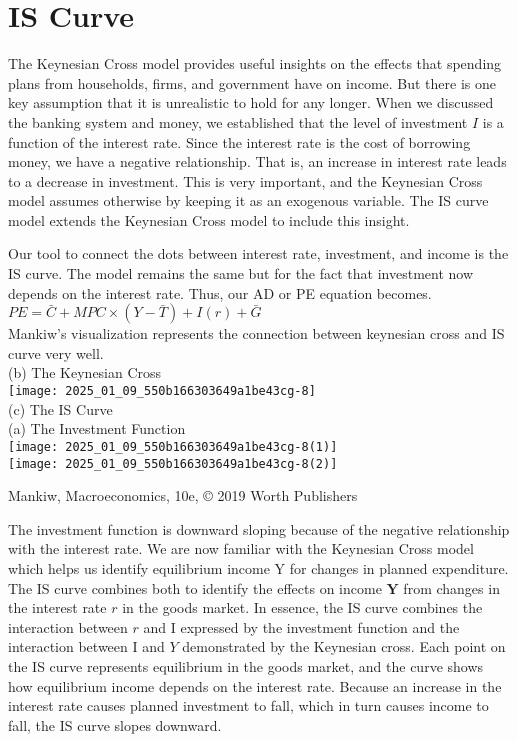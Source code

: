 \documentclass[10pt]{article}
\begin{document}
\section*{IS Curve}
The Keynesian Cross model provides useful insights on the effects that spending plans from households, firms, and government have on income. But there is one key assumption that it is unrealistic to hold for any longer. When we discussed the banking system and money, we established that the level of investment $I$ is a function of the interest rate. Since the interest rate is the cost of borrowing money, we have a negative relationship. That is, an increase in interest rate leads to a decrease in investment. This is very important, and the Keynesian Cross model assumes otherwise by keeping it as an exogenous variable. The IS curve model extends the Keynesian Cross model to include this insight.

Our tool to connect the dots between interest rate, investment, and income is the IS curve. The model remains the same but for the fact that investment now depends on the interest rate. Thus, our AD or PE equation becomes.\\
$P E=\bar{C}+M P C \times(Y-\bar{T})+I(r)+\bar{G}$\\
Mankiw's visualization represents the connection between keynesian cross and IS curve very well.\\
(b) The Keynesian Cross\\
\texttt{[image: 2025\_01\_09\_550b166303649a1be43cg-8]}\\
(c) The IS Curve\\
(a) The Investment Function\\
\texttt{[image: 2025\_01\_09\_550b166303649a1be43cg-8(1)]}\\
\texttt{[image: 2025\_01\_09\_550b166303649a1be43cg-8(2)]}

Mankiw, Macroeconomics, 10e, © 2019 Worth Publishers

The investment function is downward sloping because of the negative relationship with the interest rate. We are now familiar with the Keynesian Cross model which helps us identify equilibrium income Y for changes in planned expenditure. The IS curve combines both to identify the effects on income $\mathbf{Y}$ from changes in the interest rate $r$ in the goods market. In essence, the IS curve combines the interaction between $r$ and I expressed by the investment function and the interaction between I and $Y$ demonstrated by the Keynesian cross. Each point on the IS curve represents equilibrium in the goods market, and the curve shows how equilibrium income depends on the interest rate. Because an increase in the interest rate causes planned investment to fall, which in turn causes income to fall, the IS curve slopes downward.
\end{document}
